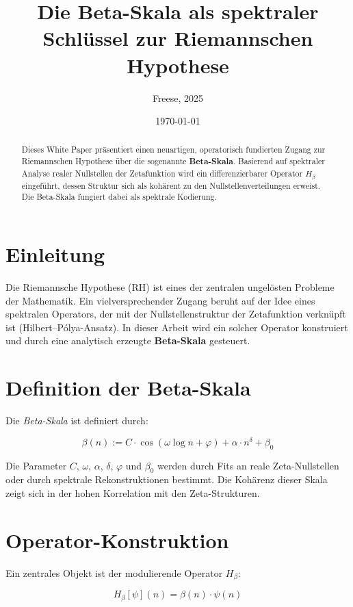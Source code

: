 \documentclass[12pt]{article}
\title{\textbf{Die Beta-Skala als spektraler Schlüssel zur Riemannschen Hypothese}}
\author{Freese, 2025}
\date{\today}
\begin{document}
\maketitle

\begin{abstract}
Dieses White Paper präsentiert einen neuartigen, operatorisch fundierten Zugang zur Riemannschen Hypothese über die sogenannte \textbf{Beta-Skala}. Basierend auf spektraler Analyse realer Nullstellen der Zetafunktion wird ein differenzierbarer Operator $H_\beta$ eingeführt, dessen Struktur sich als kohärent zu den Nullstellenverteilungen erweist. Die Beta-Skala fungiert dabei als spektrale Kodierung.
\end{abstract}

\section{Einleitung}

Die Riemannsche Hypothese (RH) ist eines der zentralen ungelösten Probleme der Mathematik. Ein vielversprechender Zugang beruht auf der Idee eines spektralen Operators, der mit der Nullstellenstruktur der Zetafunktion verknüpft ist (Hilbert–Pólya-Ansatz). In dieser Arbeit wird ein solcher Operator konstruiert und durch eine analytisch erzeugte \textbf{Beta-Skala} gesteuert.

\section{Definition der Beta-Skala}

Die \emph{Beta-Skala} ist definiert durch:

\begin{equation}
\beta(n) := C \cdot \cos(\omega \log n + \varphi) + \alpha \cdot n^\delta + \beta_0
\end{equation}

Die Parameter $C$, $\omega$, $\alpha$, $\delta$, $\varphi$ und $\beta_0$ werden durch Fits an reale Zeta-Nullstellen oder durch spektrale Rekonstruktionen bestimmt. Die Kohärenz dieser Skala zeigt sich in der hohen Korrelation mit den Zeta-Strukturen.

\section{Operator-Konstruktion}

Ein zentrales Objekt ist der modulierende Operator $H_\beta$:

\begin{equation}
H_\beta[\psi](n) = \beta(n) \cdot \psi(n)
\end{equation}
\end{document}
